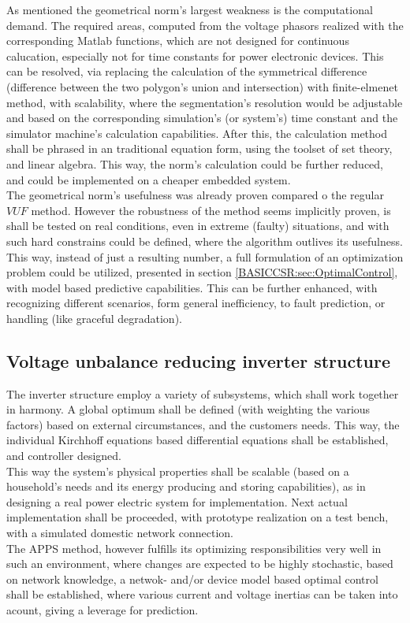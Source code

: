 		As mentioned the geometrical norm's largest weakness is the computational demand. The required areas, computed from the voltage phasors realized with the corresponding Matlab functions, which are not designed for continuous calucation, especially not for time constants for power electronic devices. This can be resolved, via replacing the calculation of the symmetrical difference (difference between the two polygon's union and intersection) with finite-elmenet method, with scalability, where the segmentation's resolution would be adjustable and based on the corresponding simulation's (or system's) time constant and the simulator machine's calculation capabilities. After this, the calculation method shall be phrased in an traditional equation form, using the toolset of set theory, and linear algebra. This way, the norm's calculation could be further reduced, and could be implemented on a cheaper embedded system.\\
		The geometrical norm's usefulness was already proven compared o the regular $VUF$ method. However the robustness of the method seems implicitly proven, is shall be tested on real conditions, even in extreme (faulty) situations, and with such hard constrains could be defined, where the algorithm outlives its usefulness. This way, instead of just a resulting number, a full formulation of an optimization problem could be utilized, presented in section \ref{BASICCSR:sec:OptimalControl}, with model based predictive capabilities. This can be further enhanced, with recognizing different scenarios, form general inefficiency, to fault prediction, or handling (like graceful degradation).
		
		\subsection{Voltage unbalance reducing inverter structure}
		
		The inverter structure employ a variety of subsystems, which shall work together in harmony. A global optimum shall be defined (with weighting the various factors) based on external circumstances, and the customers needs. This way, the individual Kirchhoff equations based differential equations shall be established, and controller designed.\\
		This way the system's physical properties shall be scalable (based on a household's needs and its energy producing and storing capabilities), as in designing a real power electric system for implementation. Next actual implementation shall be proceeded, with prototype realization on a test bench, with a simulated domestic network connection. \\
		The APPS method, however fulfills its optimizing responsibilities very well in such an environment, where changes are expected to be highly stochastic, based on network knowledge, a netwok- and/or device model based optimal control shall be established, where various current and voltage inertias can be taken into acount, giving a leverage for prediction. 
		
